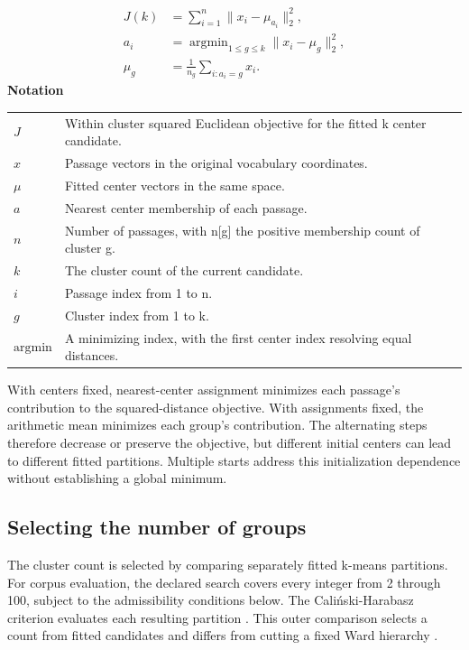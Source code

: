\documentclass[10pt,letterpaper]{article}
\newcommand{\notlabel}{\noindent\textbf{Notation}\par\nobreak\vspace{4pt}}
\begin{document}
\par\noindent\begin{minipage}{\linewidth}
\begin{equation}\label{eq:kmeansobjective}
\begin{aligned}J(k)&=\sum_{i=1}^{n}\lVert x_i-\mu_{a_i}\rVert_2^2,\\a_i&=\mathop{\arg\min}_{1\leq g\leq k}\lVert x_i-\mu_g\rVert_2^2,\\\mu_g&=\frac{1}{n_g}\sum_{i:a_i=g}x_i.\end{aligned}
\end{equation}
\notlabel
{\fontsize{8.5}{10.5}\selectfont\setlength{\tabcolsep}{0pt}\renewcommand{\arraystretch}{1.12}
\begin{tabularx}{\linewidth}{@{}p{.14\linewidth}X@{}}
$J$ & Within cluster squared Euclidean objective for the fitted k center candidate.\\
$x$ & Passage vectors in the original vocabulary coordinates.\\
$\mu$ & Fitted center vectors in the same space.\\
$a$ & Nearest center membership of each passage.\\
$n$ & Number of passages, with n[g] the positive membership count of cluster g.\\
$k$ & The cluster count of the current candidate.\\
$i$ & Passage index from 1 to n.\\
$g$ & Cluster index from 1 to k.\\
$\mathrm{argmin}$ & A minimizing index, with the first center index resolving equal distances.\\
\end{tabularx}}
\par\vspace{2pt}
\end{minipage}\par
With centers fixed, nearest-center assignment minimizes each passage's contribution to the squared-distance objective. With assignments fixed, the arithmetic mean minimizes each group's contribution. The alternating steps therefore decrease or preserve the objective, but different initial centers can lead to different fitted partitions. Multiple starts address this initialization dependence without establishing a global minimum.\par

\subsection{Selecting the number of groups}
The cluster count is selected by comparing separately fitted k-means partitions. For corpus evaluation, the declared search covers every integer from 2 through 100, subject to the admissibility conditions below. The Caliński-Harabasz criterion evaluates each resulting partition \cite{calinski}. This outer comparison selects a count from fitted candidates and differs from cutting a fixed Ward hierarchy \cite{ward}.\par
\end{document}
